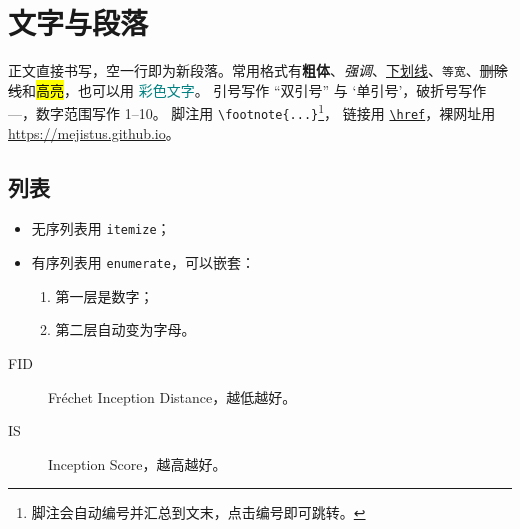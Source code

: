 \newcommand{\E}{\mathbb{E}}
\newcommand{\R}{\mathbb{R}}
\newtheorem{hyp}{假设}

\begin{abstract}
这份示例本身就是一份模板：每一节演示一类日常写作场景。打开编辑器即可看到对应的 LaTeX 源码，复制需要的片段即可使用。
编辑器支持语法补全：输入 \verb|\| 加字母补全命令，\verb|\begin{| 补全环境，\verb|\ref{| 补全文中的标签，\verb|\cite{| 补全文献；在手写的 \verb|\begin{...}| 行尾按回车会自动补上 \verb|\end{...}|。
常用结构还可以用代码片段快速输入：例如输入 \texttt{fig} 后按 Tab 展开整个 figure 环境，再按 Tab 依次跳到图片路径、标题和标签；全部触发词见编辑器“Menu”菜单中的“Snippets”。
编辑器还带有语法高亮、\verb|Cmd/Ctrl+/| 注释切换，以及“Problems”检查：未闭合的环境或公式、指向不存在标签的引用、表格列数不符、缺失的图片等都会列出，点击即可跳到对应行。
“Menu”菜单里还有大纲、文献导入、代码片段速查、查找替换和 Vim 键位开关。
\end{abstract}

\section{文字与段落}\label{sec:text}
正文直接书写，空一行即为新段落。常用格式有\textbf{粗体}、\emph{强调}、\underline{下划线}、\texttt{等宽}、\sout{删除线}和\hl{高亮}，也可以用 \textcolor{teal}{彩色文字}。
引号写作 ``双引号'' 与 `单引号'，破折号写作 ---，数字范围写作 1--10。
脚注用 \verb|\footnote{...}|\footnote{脚注会自动编号并汇总到文末，点击编号即可跳转。}，
链接用 \href{https://github.com/mejistus}{\texttt{\textbackslash href}}，裸网址用 \url{https://mejistus.github.io}。

\subsection{列表}
\begin{itemize}
  \item 无序列表用 \texttt{itemize}；
  \item 有序列表用 \texttt{enumerate}，可以嵌套：
  \begin{enumerate}
    \item 第一层是数字；
    \item 第二层自动变为字母。
  \end{enumerate}
\end{itemize}
\begin{description}
  \item[FID] Fréchet Inception Distance，越低越好。
  \item[IS] Inception Score，越高越好。
\end{description}

